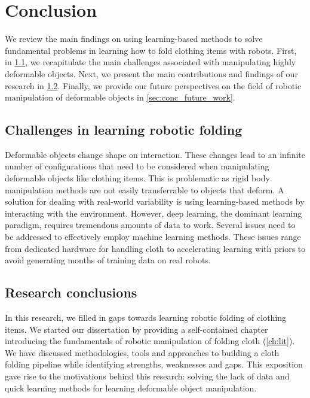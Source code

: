 \documentclass[\home/main.tex]{subfiles}
\begin{document}
\chapter{Conclusion}\label{ch:conclusion}
We review the main findings on using learning-based methods to solve fundamental problems in learning how to fold clothing items with robots. First, in \cref{sec:conc_challenges}, we recapitulate the main challenges associated with manipulating highly deformable objects. Next, we present the main contributions and findings of our research in \cref{sec:conc_research}. Finally, we provide our future perspectives on the field of robotic manipulation of deformable objects in \cref{sec:conc_future_work}.


\section{Challenges in learning robotic folding} \label{sec:conc_challenges}
Deformable objects change shape on interaction. These changes lead to an infinite number of configurations that need to be considered when manipulating deformable objects like clothing items. This is problematic as rigid body manipulation methods are not easily transferrable to objects that deform.
A solution for dealing with real-world variability is using learning-based methods by interacting with the environment. However, deep learning, the dominant learning paradigm, requires tremendous amounts of data to work. Several issues need to be addressed to effectively employ machine learning methods. These issues range from dedicated hardware for handling cloth to accelerating learning with priors to avoid generating months of training data on real robots.

\section{Research conclusions} \label{sec:conc_research}
In this research, we filled in gaps towards learning robotic folding of clothing items.
We started our dissertation by providing a self-contained chapter introducing the fundamentals of robotic manipulation of folding cloth (\cref{ch:lit}). We have discussed methodologies, tools and approaches to building a cloth folding pipeline while identifying strengths, weaknesses and gaps. This exposition gave rise to the motivations behind this research: solving the lack of data and quick learning methods for learning deformable object manipulation.
\end{document}
